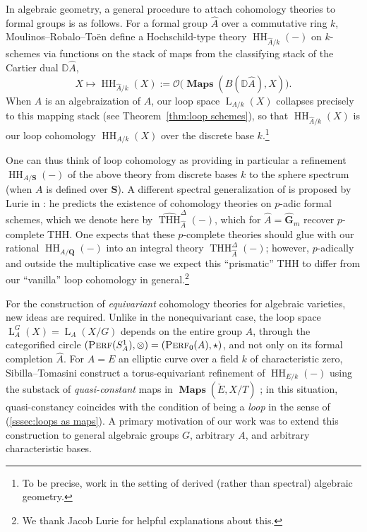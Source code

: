 \documentclass[12pt, oneside]{amsart}
\numberwithin{equation}{section}
\theoremstyle{remark}
\theoremstyle{plain}
\DeclareMathOperator{\Perf}{\textsc{Perf}}
\DeclareMathOperator{\MAP}{\mathbf{Maps}}
\newcommand{\Loop}{\operatorname{L}}
\newcommand{\OO}{\mathcal{O}}
\newcommand{\GG}{\mathbf{G}}
\newcommand{\HH}{\operatorname{HH}}
\begin{document}
In algebraic geometry, a general procedure to attach cohomology theories to formal groups is as follows.
For a formal group $\widehat{A}$ over a commutative ring $k$, Moulinos--Robalo--To\"en \cite{MRT} define a Hochschild-type theory $\operatorname{HH}_{\widehat{A}/k}(-)$ on $k$-schemes via functions on the stack of maps from the classifying stack of the Cartier dual $\mathbb{D}\widehat{A}$,
\[
  X \mapsto \operatorname{HH}_{\widehat{A}/k}(X) := \OO\bigl( \MAP(B(\mathbb{D}\widehat{A}), X) \bigr).
\]
When $A$ is an algebraization of $\widehat{A}$, our loop space $\Loop_{A/k}(X)$ collapses precisely to this mapping stack (see Theorem~\ref{thm:loop schemes}), so that $\operatorname{HH}_{\widehat{A}/k}(X)$ is our loop cohomology $\HH_{A/k}(X)$ over the discrete base $k$.\footnote{%
  To be precise, \cite{MRT} work in the setting of derived (rather than spectral) algebraic geometry.
}

One can thus think of loop cohomology as providing in particular a refinement $\HH_{A/\mathbf{S}}(-)$ of the above theory from discrete bases $k$ to the sphere spectrum (when $A$ is defined over $\mathbf{S}$).
A different spectral generalization of \cite{MRT} is proposed by Lurie in \cite[\S 11]{LuriePrism}: he predicts the existence of cohomology theories on $p$-adic formal schemes, which we denote here by $\widehat{\operatorname{THH}}^{\Delta}_{\widehat{A}}(-)$, which for $\widehat{A} = \widehat{\GG}_m$ recover $p$-complete THH.
One expects that these $p$-complete theories should glue with our rational $\HH_{A/\mathbf{Q}}(-)$ into an integral theory $\operatorname{THH}^{\Delta}_{\widehat{A}}(-)$; however, $p$-adically and outside the multiplicative case we expect this ``prismatic'' THH to differ from our ``vanilla'' loop cohomology in general.\footnote{%
  We thank Jacob Lurie for helpful explanations about this.
}

For the construction of \emph{equivariant} cohomology theories for algebraic varieties, new ideas are required.
Unlike in the nonequivariant case, the loop space $\Loop_A^G(X) = \Loop_A(X/G)$ depends on the entire group $A$, through the categorified circle $(\Perf(S^1_A),\otimes) = (\Perf_0(A), \star)$, and not only on its formal completion $\widehat{A}$.
For $A=E$ an elliptic curve over a field $k$ of characteristic zero, Sibilla--Tomasini \cite{ST} construct a torus-equivariant refinement of $\HH_{E/k}(-)$ using the substack of \emph{quasi-constant} maps in $\MAP(\check{E}, X/T)$ \cite[Def.~2.18]{ST}; in this situation, quasi-constancy coincides with the condition of being a \emph{loop} in the sense of (\ref{sssec:loops as maps}).
A primary motivation of our work was to extend this construction to general algebraic groups $G$, arbitrary $A$, and arbitrary characteristic bases.
\end{document}
